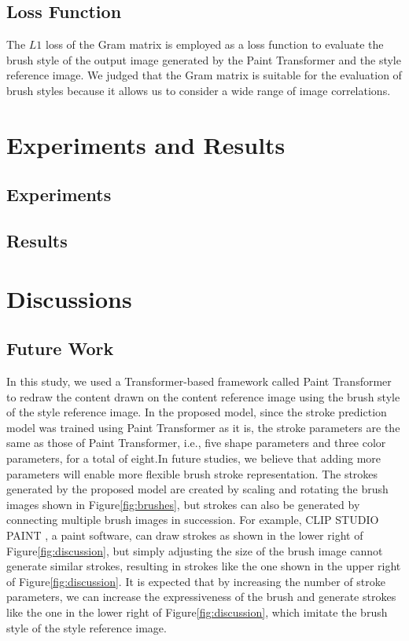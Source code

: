 \documentclass{mva_style}
\begin{document}
\subsection{Loss Function}
The $L1$ loss of the Gram matrix is employed as a loss function to evaluate 
the brush style of the output image generated by the Paint Transformer and 
the style reference image. We judged that the Gram matrix is suitable for 
the evaluation of brush styles because it allows us to consider a wide range 
of image correlations.

\section{Experiments and Results}
\subsection{Experiments}
\subsection{Results}

\section{Discussions}
\subsection{Future Work}
In this study, we used a Transformer-based framework called Paint Transformer 
to redraw the content drawn on the content reference image using the brush 
style of the style reference image. In the proposed model, since the stroke 
prediction model was trained using Paint Transformer as it is, the stroke 
parameters are the same as those of Paint Transformer, i.e., five shape 
parameters and three color parameters, for a total of eight.In future studies, 
we believe that adding more parameters will enable more flexible brush stroke 
representation. The strokes generated by the proposed model are created by 
scaling and rotating the brush images shown in Figure\ref{fig:brushes}, but 
strokes can also be generated by connecting multiple brush images in 
succession. For example, CLIP STUDIO PAINT \cite{ClipStudio}, a paint software, 
can draw strokes as shown in the lower right of Figure\ref{fig:discussion}, but simply 
adjusting the size of the brush image cannot generate similar strokes, 
resulting in strokes like the one shown in the upper right of Figure\ref{fig:discussion}.
It is expected that by increasing the number of stroke parameters, we can 
increase the expressiveness of the brush and generate strokes like the one 
in the lower right of Figure\ref{fig:discussion}, which imitate the brush style of the 
style reference image. 
\end{document}
